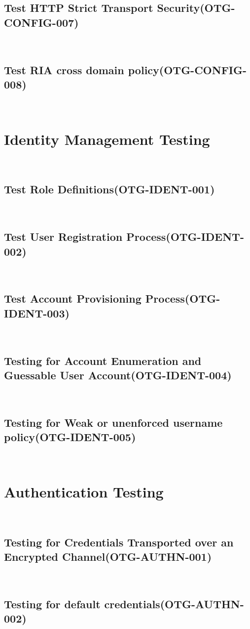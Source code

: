 \documentclass[headsepline,footsepline,footinclude=false,oneside,fontsize=11pt,paper=a4,listof=totoc,bibliography=totoc]{scrbook} %
\begin{document}
\subsection{Test HTTP Strict Transport Security(OTG-CONFIG-007)}\
\pagebreak
\subsection{Test RIA cross domain policy(OTG-CONFIG-008)}\


\pagebreak
\section{Identity Management Testing}\
\subsection{Test Role Definitions(OTG-IDENT-001)}\
\pagebreak
\subsection{Test User Registration Process(OTG-IDENT-002)}\
\pagebreak
\subsection{Test Account Provisioning Process(OTG-IDENT-003)}\
\pagebreak
\subsection{Testing for Account Enumeration and Guessable User Account(OTG-IDENT-004)}\
\pagebreak
\subsection{Testing for Weak or unenforced username policy(OTG-IDENT-005)}\

\pagebreak
\section{Authentication Testing}\
\subsection{Testing for Credentials Transported over an Encrypted Channel(OTG-AUTHN-001)}\
\pagebreak
\subsection{Testing for default credentials(OTG-AUTHN-002)}\
\pagebreak
\end{document}
